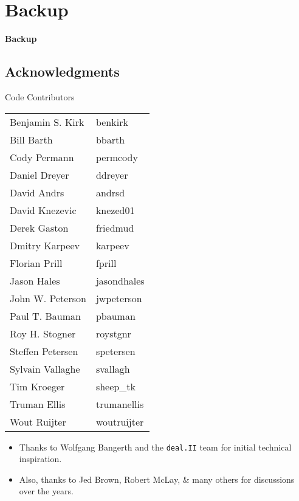 \section{Backup}
\frame
{
  \begin{center}
    \vspace{5em}
    \Huge{\textbf{Backup}}
  \end{center}
}


\subsection{Acknowledgments}
\begin{frame}[shrink]
  \begin{block}{Code Contributors}
    \scriptsize
    \begin{center}
      \begin{tabular}{|l|l|} \hline
        Benjamin S. Kirk & benkirk \\
        Bill Barth       & bbarth \\
        Cody Permann     & permcody \\
        Daniel Dreyer    & ddreyer \\
        David Andrs      & andrsd \\
        David Knezevic   & knezed01 \\
        Derek Gaston     & friedmud \\
        Dmitry Karpeev   & karpeev \\
        Florian Prill    & fprill \\
        Jason Hales      & jasondhales \\
        John W. Peterson & jwpeterson \\
        Paul T. Bauman   & pbauman \\
        Roy H. Stogner   & roystgnr \\
        Steffen Petersen & spetersen \\
        Sylvain Vallaghe & svallagh \\
        Tim Kroeger      & sheep\_tk \\
        Truman Ellis     & trumanellis \\
        Wout Ruijter     & woutruijter \\ \hline
      \end{tabular}
    \end{center}
    \begin{itemize}
      \item Thanks to Wolfgang Bangerth and the \texttt{deal.II} team for initial technical inspiration.
      \item Also, thanks to Jed Brown, Robert McLay, \& many others for discussions over the years.
    \end{itemize}
  \end{block}
\end{frame}


